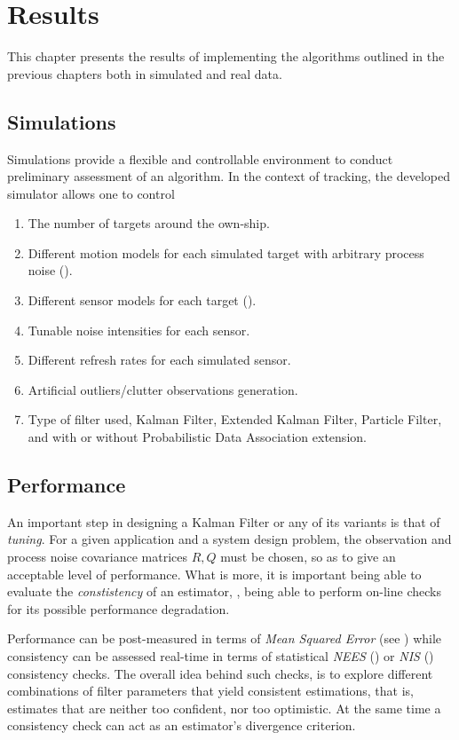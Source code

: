 \chapter{Results}\label{ch:Results}
This chapter presents the results of implementing the algorithms outlined in the previous chapters both in simulated and real data.

\section{Simulations}
Simulations provide a flexible and controllable environment to conduct preliminary assessment of an algorithm. In the context of tracking, the developed simulator allows one to control 
\begin{enumerate}[label=(\alph*)] 
	\item The number of targets around the own-ship.
	\item Different motion models for each simulated target with arbitrary process noise ().
	\item Different sensor models for each target ().
	\item Tunable noise intensities for each sensor.
	\item Different refresh rates for each simulated sensor.
	\item Artificial outliers/clutter observations generation.
	\item Type of filter used, \ie Kalman Filter, Extended Kalman Filter, Particle Filter, and with or without Probabilistic Data Association extension.
\end{enumerate}

\section{Performance} \label{sec:performance}


An important step in designing a Kalman Filter or any of its variants is that of \emph{tuning}. For a given application and a system design problem, the observation and process noise covariance matrices $R,Q$ must be chosen, so as to give an acceptable level of performance. What is more, it is important being able to evaluate the \emph{constistency} of an estimator, \ie, being able to perform on-line checks for its possible performance degradation. 

Performance can be post-measured in terms of \emph{Mean Squared Error} (see ) while consistency can be assessed real-time in terms of statistical \emph{NEES} () or \emph{NIS} () consistency checks. The overall idea behind such checks, is to explore different combinations of filter parameters that yield consistent estimations, that is, estimates that are neither too confident, nor too optimistic. At the same time a consistency check can act as an estimator's divergence criterion.

